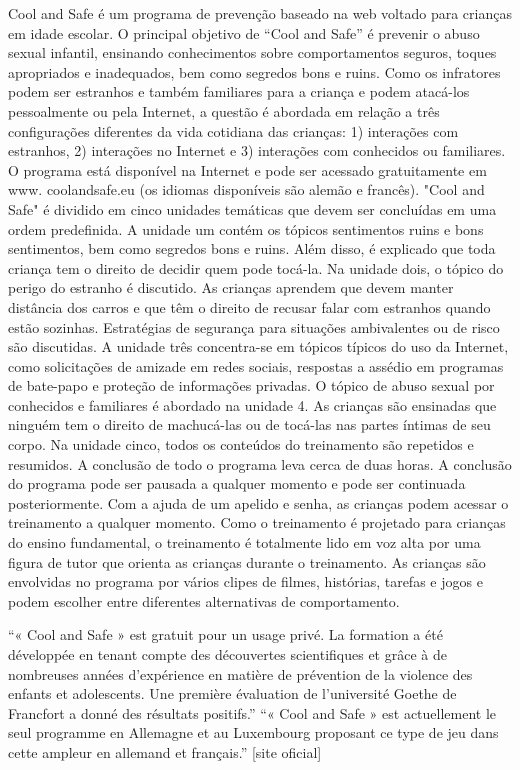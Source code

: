 Cool and Safe é um programa de prevenção baseado na web voltado para crianças em idade escolar. O principal objetivo de “Cool and Safe” é prevenir o abuso sexual infantil, ensinando conhecimentos sobre comportamentos seguros, toques apropriados e inadequados, bem como segredos bons e ruins. Como os infratores podem ser estranhos e também familiares para a criança e podem atacá-los pessoalmente ou pela Internet, a questão é abordada em relação a três configurações diferentes da vida cotidiana das crianças: 1) interações com estranhos, 2) interações no Internet e 3) interações com conhecidos ou familiares. O programa está disponível na Internet e pode ser acessado gratuitamente em www. coolandsafe.eu (os idiomas disponíveis são alemão e francês). "Cool and Safe" é dividido em cinco unidades temáticas que devem ser concluídas em uma ordem predefinida. A unidade um contém os tópicos sentimentos ruins e bons sentimentos, bem como segredos bons e ruins. Além disso, é explicado que toda criança tem o direito de decidir quem pode tocá-la. Na unidade dois, o tópico do perigo do estranho é discutido. As crianças aprendem que devem manter distância dos carros e que têm o direito de recusar falar com estranhos quando estão sozinhas. Estratégias de segurança para situações ambivalentes ou de risco são discutidas. A unidade três concentra-se em tópicos típicos do uso da Internet, como solicitações de amizade em redes sociais, respostas a assédio em programas de bate-papo e proteção de informações privadas. O tópico de abuso sexual por conhecidos e familiares é abordado na unidade 4. As crianças são ensinadas que ninguém tem o direito de machucá-las ou de tocá-las nas partes íntimas de seu corpo. Na unidade cinco, todos os conteúdos do treinamento são repetidos e resumidos. A conclusão de todo o programa leva cerca de duas horas. A conclusão do programa pode ser pausada a qualquer momento e pode ser continuada posteriormente. Com a ajuda de um apelido e senha, as crianças podem acessar o treinamento a qualquer momento. Como o treinamento é projetado para crianças do ensino fundamental, o treinamento é totalmente lido em voz alta por uma figura de tutor que orienta as crianças durante o treinamento. As crianças são envolvidas no programa por vários clipes de filmes, histórias, tarefas e jogos e podem escolher entre diferentes alternativas de comportamento.

``« Cool and Safe » est gratuit pour un usage privé. La formation a été développée en tenant compte des découvertes scientifiques et grâce à de nombreuses années d'expérience en matière de prévention de la violence des enfants et adolescents. Une première évaluation de l'université Goethe de Francfort a donné des résultats positifs.'' ``« Cool and Safe » est actuellement le seul programme en Allemagne et au Luxembourg proposant ce type de jeu dans cette ampleur en allemand et français.'' [site oficial]

